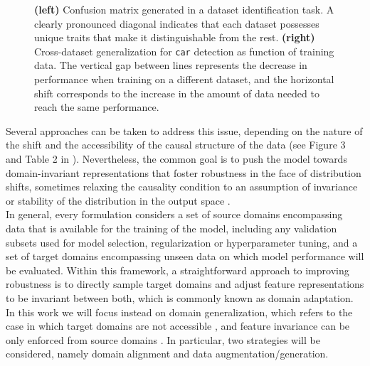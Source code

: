\begin{figure}[H]
\begin{subfigure}[b]{0.32\textwidth}
    \end{subfigure}
       \caption{
        \textbf{(left)} Confusion matrix generated in a dataset
        identification task. A clearly pronounced diagonal 
        indicates that each dataset possesses unique traits that
        make it distinguishable from the rest.
        \textbf{(right)} Cross-dataset generalization
        for \texttt{car} detection as function of training data. 
        The vertical gap between lines represents the decrease in performance 
        when training on a different dataset, and the horizontal 
        shift corresponds to the increase in the amount of data needed 
        to reach the same performance.
        \cite{torralbaUnbiasedLookDataset2011}}
       \label{fig:dataset_bias}
\end{figure}

Several approaches can be taken to address this issue, depending
on the nature of the shift and the accessibility of the
causal structure of the data (see Figure 3 and Table 2 in 
\cite{wangGeneralizingUnseenDomains2022}).
Nevertheless, the common goal is to push the model towards
domain-invariant representations that foster robustness in the
face of distribution shifts, sometimes relaxing the causality condition
to an assumption of invariance or stability of the distribution in the output space
\cite{wangGeneralizingUnseenDomains2022,liuOutOfDistributionGeneralizationSurvey2023}. \\

In general, every formulation considers a set of source domains 
encompassing data that is available for the training of the model,
including any validation subsets used for model selection, 
regularization or hyperparameter tuning, and a set of target 
domains encompassing unseen data on which model performance will
be evaluated. Within this framework, a straightforward approach
to improving robustness is to directly sample target domains
and adjust feature representations to be invariant 
between both, which is commonly known as domain adaptation. \\

In this work we will focus instead on domain generalization, which 
refers to the case in which target domains are not accessible ,
and feature invariance can be only enforced
from source domains
\cite{blanchardGeneralizingSeveralRelated}. In particular, two strategies will be considered, 
namely domain alignment and data augmentation/generation. \\

